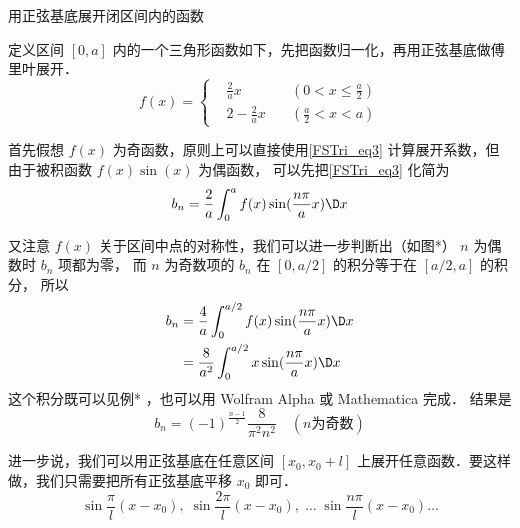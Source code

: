 \begin{exam}{用正弦基底展开闭区间内的函数}

定义区间 $[0,a]$ 内的一个三角形函数如下，先把函数归一化，再用正弦基底做傅里叶展开．
\begin{equation}
f(x) = 
\left\{\begin{aligned}
&\frac 2a x &\quad (0 < x \le \frac a2)\\
&2 -\frac 2a x &\quad (\frac a2 < x < a)
\end{aligned}\right.
\end{equation}

首先假想 $f(x)$ 为奇函数，原则上可以直接使用\autoref{FSTri_eq3} 计算展开系数，但由于被积函数 $f(x)\sin(x)$ 为偶函数， 可以先把\autoref{FSTri_eq3} 化简为%
\begin{equation}
{b_n} = \frac{2}{a}\int_{0}^a {f( x )\sin (\frac{n\pi}{a}x)\D x}
\end{equation}


又注意 $f(x)$ 关于区间中点的对称性，我们可以进一步判断出（如图*） $n$ 为偶数时 $b_n$ 项都为零， 而 $n$ 为奇数项的 $b_n$ 在 $[0,a/2]$ 的积分等于在 $[a/2,a]$ 的积分， 所以
\begin{equation}\begin{aligned}
{b_n} &= \frac{4}{a}\int_{0}^{a/2} {f( x )\sin (\frac{n\pi}{a}x)\D x}\\
&= \frac{8}{a^2} \int_{0}^{a/2} {x\sin (\frac{n\pi}{a}x)\D x}
\end{aligned}\end{equation}
这个积分既可以见例*%
，也可以用 Wolfram Alpha 或 Mathematica 完成．%
结果是
\begin{equation}
b_n = (-1)^{\frac{n-1}{2}} \frac{8}{\pi^2 n^2} \quad (n\text{为奇数})
\end{equation}

\end{exam}

进一步说，我们可以用正弦基底在任意区间 $[x_0,x_0+l]$ 上展开任意函数．要这样做，我们只需要把所有正弦基底平移 $x_0$ 即可．
\begin{equation}
\sin\frac{\pi}{l} (x-x_0),\;   \sin\frac{2\pi}{l} (x-x_0),\;    \dots\;\sin\frac{n\pi}{l} (x-x_0) \dots
\end{equation}


